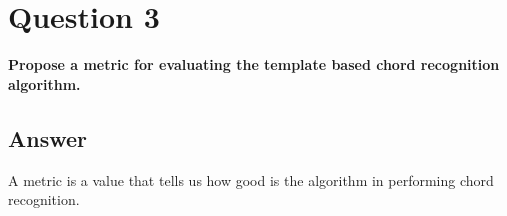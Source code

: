 \documentclass[
	12pt, %
]{fphw}
\begin{document}
\newpage
\section*{\color{red}Question 3}

\begin{problem}
	\textbf{Propose a metric for evaluating the template based chord recognition algorithm.}
\end{problem}

\subsection*{\color{blue}Answer}

A metric is a value that tells us how good is the algorithm in performing chord recognition.
\end{document}
